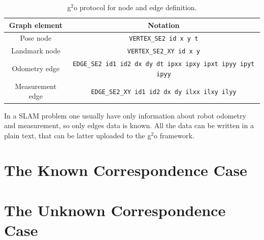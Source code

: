 \begin{table}[htbp!]
    \centering
    \begin{tabular}{|c|c|}
        \hline
        Graph element & Notation\\
        \hline
        Pose node & \texttt{VERTEX\_SE2 id x y t}\\
        Landmark node & \texttt{VERTEX\_SE2\_XY id x y}\\
        Odometry edge & \texttt{EDGE\_SE2 id1 id2 dx dy dt ipxx ipxy ipxt ipyy ipyt ipyy}\\
        Measurement edge & \texttt{EDGE\_SE2\_XY id1 id2 dx dy ilxx ilxy ilyy}\\
        \hline
    \end{tabular}
    \caption{g$^2$o protocol for node and edge definition.}
    \label{tab:protocol}
\end{table}

In a SLAM problem one usually have only information about robot odometry and measurement, so only edges data is known. All the data can be written in a plain text, that can be latter uploaded to the g$^2$o framework.

\section{The Known Correspondence Case}

\section{The Unknown Correspondence Case}
